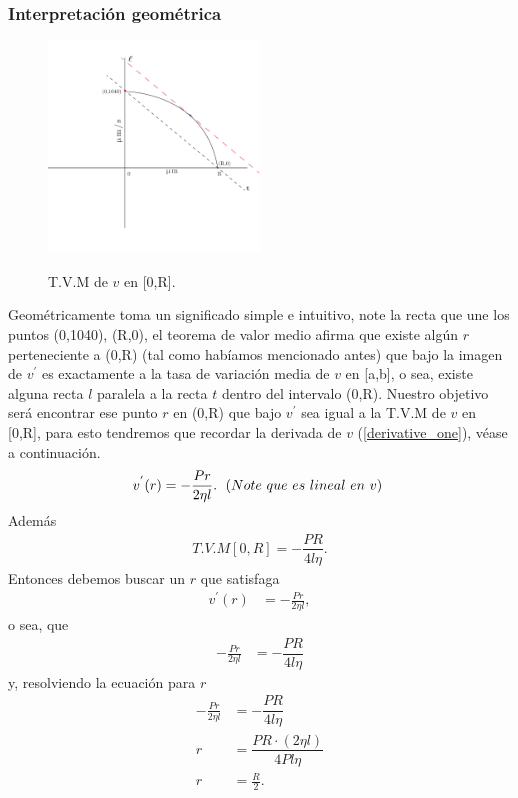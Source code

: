 \subsubsection{Interpretación geométrica}
\begin{figure}
\caption{T.V.M de $v$ en [0,R].}
    \centering
\includegraphics[width=0.50\textwidth]{capitulos/graficas/valmel.pdf}\label{fig:graphic_TVM}
\end{figure}
Geométricamente toma un significado simple e intuitivo, note la recta que une los puntos (0,1040), (R,0), el teorema de valor medio afirma que existe algún $r$ perteneciente a (0,R) (tal como habíamos mencionado antes) que bajo la imagen de $v^{'}$ es exactamente a la tasa de variación media de $v$ en [a,b], o sea, existe alguna recta $l$ paralela a la recta $t$ dentro del intervalo (0,R).
Nuestro objetivo será encontrar ese punto $r$ en (0,R) que bajo $v^{'}$ sea igual a la T.V.M de $v$ en [0,R], para esto tendremos que recordar la derivada de $v$ (\ref{derivative_one}), véase a continuación.
\begin{align*}
    v^{'}(r)=-\frac{Pr}{2\eta l}. \hspace{0.1cm}\label{derivative_one} \text{ ($Note\ que \ es \ lineal \ en\ v)$ }
\end{align*}
Además
\begin{align*}
    T.V.M[0,R]=-\dfrac{PR}{4l\eta}.
\end{align*}
Entonces debemos buscar un $r$ que satisfaga
\begin{align*}
    v^{'}(r)&=-\frac{Pr}{2\eta l},
\end{align*}
o sea, que
\begin{align*}
    -\frac{Pr}{2\eta l}&=-\dfrac{PR}{4l\eta}
\end{align*}
y, resolviendo la ecuación para $r$
\begin{align*}
     -\frac{Pr}{2\eta l}&=-\dfrac{PR}{4l\eta}\\
      r&=\dfrac{PR\cdot\left(2\eta l\right)}{4Pl\eta}\\
      r&=\frac{R}{2}.
\end{align*}\\
